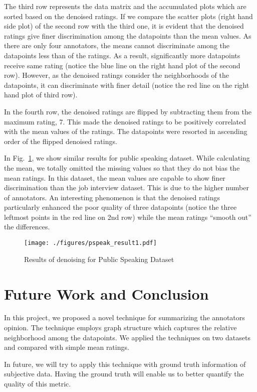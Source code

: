 \documentclass{article} \usepackage{nips14submit_e,times}
\begin{document}
The third row represents the data matrix and the accumulated plots which are sorted based on the denoised ratings. If we compare the scatter plots (right hand side plot) of the second row with the third one, it is evident that the denoised ratings give finer discrimination among the datapoints than the mean values. As there are only four annotators, the means cannot discriminate among the datapoints less than  of the ratings. As a result, significantly more datapoints receive same rating (notice the blue line on the right hand plot of the second row). However, as the denoised ratings consider the neighborhoods of the datapoints, it can discriminate with finer detail (notice the red line on the right hand plot of third row).

In the fourth row, the denoised ratings are flipped by subtracting them from the maximum rating, 7. This made the denoised ratings to be positively correlated with the mean values of the ratings. The datapoints were resorted in ascending order of the flipped denoised ratings. 

In Fig.~\ref{Fig:pspeak_result}, we show similar results for public speaking dataset. While calculating the mean, we totally omitted the missing values so that they do not bias the mean ratings. In this dataset, the mean values are capable to show finer discrimination than the job interview dataset. This is due to the higher number of annotators. An interesting phenomenon is that the denoised ratings particularly enhanced the poor quality of three datapoints (notice the three leftmost points in the red line on 2nd row) while the mean ratings ``smooth out'' the differences. 
\begin{figure}
\centering
\texttt{[image: ./figures/pspeak\_result1.pdf]}
\caption{Results of denoising for Public Speaking Dataset}\label{Fig:pspeak_result}
\end{figure}

\section{Future Work and Conclusion}
In this project, we proposed a novel technique for summarizing the annotators opinion. The technique employs graph structure which captures the relative neighborhood among the datapoints. We applied the techniques on two datasets and compared with simple mean ratings.

In future, we will try to apply this technique with ground truth information of subjective data. Having the ground truth will enable us to better quantify the quality of this metric.



\end{document}
